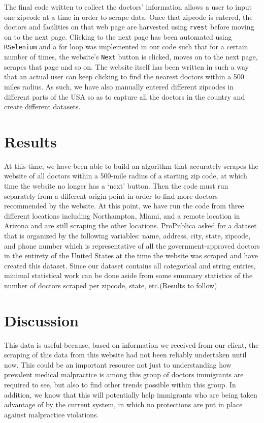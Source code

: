 \documentclass[10pt,letterpaper]{article}
\begin{document}
The final code written to collect the doctors' information allows a user
to input one zipcode at a time in order to scrape data. Once that
zipcode is entered, the doctors and facilities on that web page are
harvested using \texttt{rvest} before moving on to the next page.
Clicking to the next page has been automated using \texttt{RSelenium}
and a for loop was implemented in our code such that for a certain
number of times, the website's \texttt{Next} button is clicked, moves on
to the next page, scrapes that page and so on. The website itself has
been written in such a way that an actual user can keep clicking to find
the nearest doctors within a 500 miles radius. As such, we have also
manually entered different zipcodes in different parts of the USA so as
to capture all the doctors in the country and create different datasets.

\section{Results}\label{results}

At this time, we have been able to build an algorithm that accurately
scrapes the website of all doctors within a 500-mile radius of a
starting zip code, at which time the website no longer has a `next'
button. Then the code must run separately from a different origin point
in order to find more doctors recommended by the website. At this point,
we have run the code from three different locations including
Northampton, Miami, and a remote location in Arizona and are still
scraping the other locations. ProPublica asked for a dataset that is
organized by the following variables: name, address, city, state,
zipcode, and phone number which is representative of all the
government-approved doctors in the entirety of the United States at the
time the website was scraped and have created this dataset. Since our
dataset contains all categorical and string entries, minimal statistical
work can be done aside from some summary statistics of the number of
doctors scraped per zipcode, state, etc.(Results to follow)

\section{Discussion}\label{discussion}

This data is useful because, based on information we received from our
client, the scraping of this data from this website had not been
reliably undertaken until now. This could be an important resource not
just to understanding how prevalent medical malpractice is among this
group of doctors immigrants are required to see, but also to find other
trends possible within this group. In addition, we know that this will
potentially help immigrants who are being taken advantage of by the
current system, in which no protections are put in place against
malpractice violations.
\end{document}
